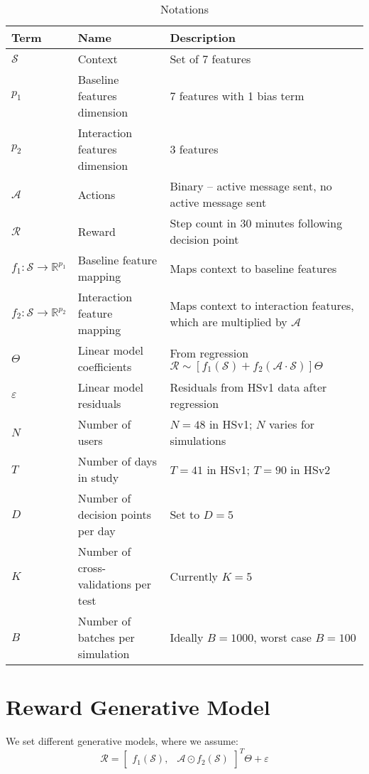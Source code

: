   \begin{table}
 \caption{Notations}
 \label{Notation Table}
 \centering \begin{tabular*}
{0.987\textwidth}
{|p{}|p{}|p{}|}
\toprule
Term & Name & Description \\
\midrule
$\mathcal{S}$ & Context & Set of 7 features     \\
$p_1$ & Baseline features dimension & 7 features with 1 bias term \\
$p_2$ & Interaction features dimension & 3 features \\
$\mathcal{A}$ & Actions &  Binary -- active message sent, no active message sent   \\
$\mathcal{R}$ & Reward &  Step count in $30$ minutes following decision point  \\
$f_1 : \mathcal{S} \to \mathbb{R}^{p_1}$ & Baseline feature mapping & Maps context to baseline features \\
$f_2 : \mathcal{S} \to \mathbb{R}^{p_2}$ & Interaction feature mapping & Maps context to interaction features, which are multiplied by $\mathcal{A}$ \\
$\Theta$ & Linear model coefficients & From regression $\mathcal{R} \sim [f_1(\mathcal{S}) + f_2(\mathcal{A} \cdot \mathcal{S})]\Theta$ \\
$\varepsilon$ & Linear model residuals & Residuals from HSv1 data after regression \\
$N$ & Number of users  & $N =48$ in HSv1; $N$ varies for simulations  \\
$T$ & Number of days in study  & $T = 41$ in HSv1; $T = 90$ in HSv2  \\
$D$ & Number of decision points per day &  Set to $D = 5$ \\
$K$ & Number of cross-validations per test & Currently $K = 5$ 
\\
$B$ & Number of batches per simulation  & Ideally $B = 1000$, worst case $B = 100$\\ \bottomrule
\end{tabular*}
  \end{table}



\section{Reward Generative Model}

We set different generative models, where we assume:
\begin{equation}
\mathcal{R} = \begin{bmatrix}f_1(\mathcal{S}), &
\mathcal{A} \odot f_2(\mathcal{S})
\end{bmatrix}^T \Theta + \varepsilon
\end{equation}

